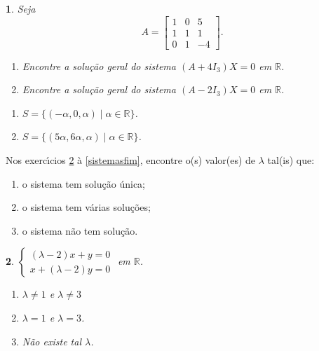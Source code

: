 \documentclass[12pt]{exam}
\newtheorem{exercicio}{}
\newcommand{\real}{\mathbb{R}}
\begin{document}
\begin{exercicio}
  Seja
  \[
    A = \begin{bmatrix}
      1 & 0 & 5\\
      1 & 1 & 1\\
      0 & 1 & -4
    \end{bmatrix}.
  \]
\begin{enumerate}[label={\alph*})]
  \item Encontre a solu\c{c}\~ao geral do sistema $(A + 4I_3)X = 0$ em $\real$.
  \item Encontre a solu\c{c}\~ao geral do sistema $(A - 2I_3)X = 0$ em $\real$.
\end{enumerate}
\begin{solucao}
  \begin{enumerate}[label={\alph*})]
    \item $S = \{(-\alpha, 0, \alpha) \mid \alpha \in \real\}$.
    \item $S = \{(5\alpha, 6\alpha, \alpha) \mid \alpha \in \real\}$.
  \end{enumerate}
\end{solucao}
\end{exercicio}

Nos exerc{\'\i}cios \ref{sistemasinicio} \`a \ref{sistemasfim}, encontre o(s) valor(es) de $\lambda$ tal(is) que:
\begin{enumerate}[label={\alph*})]
  \item o sistema tem solu\c{c}\~ao \'unica;
  \item o sistema tem v\'arias solu\c{c}\~oes;
  \item o sistema n\~ao tem solu\c{c}\~ao.
\end{enumerate}

\begin{exercicio}\label{sistemasinicio}
$\begin{cases}
  (\lambda - 2)x + y = 0\\
  x + (\lambda - 2)y = 0
\end{cases}$ em $\real$.
\begin{solucao}
  \begin{enumerate}[label={\alph*})]
    \item $\lambda \ne 1$ e $\lambda \ne 3$
    \item $\lambda = 1$ e $\lambda = 3$.
    \item N\~ao existe tal $\lambda$.
  \end{enumerate}
\end{solucao}
\end{exercicio}
\end{document}
